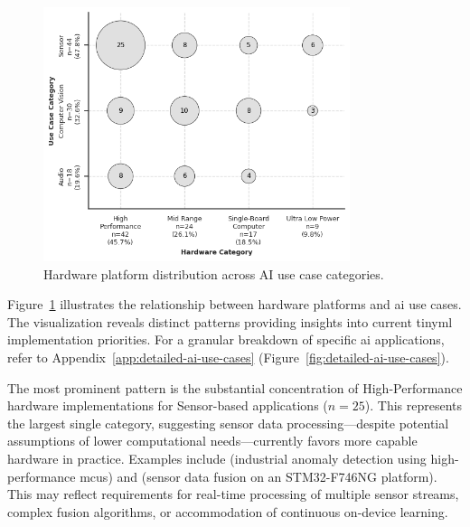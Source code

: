 \begin{figure}[htbp]
    \centering
    \includegraphics[width=0.8\textwidth]{figs/research_results/sms_hardware_use_case.png} 
    \caption[Mapping of Hardware Platforms to AI Use Cases]{Hardware platform distribution across AI use case categories.}
    \label{fig:bubble-chart-hardware-vs-aiusecase} %
\end{figure}

Figure~\ref{fig:bubble-chart-hardware-vs-aiusecase} illustrates the relationship between hardware platforms and \gls{ai} use cases. The visualization reveals distinct patterns providing insights into current \gls{tinyml} implementation priorities. For a granular breakdown of specific \gls{ai} applications, refer to Appendix~\ref{app:detailed-ai-use-cases} (Figure~\ref{fig:detailed-ai-use-cases}).

The most prominent pattern is the substantial concentration of High-Performance hardware implementations for Sensor-based applications ($n=25$). This represents the largest single category, suggesting sensor data processing—despite potential assumptions of lower computational needs—currently favors more capable hardware in practice. Examples include \cite{antoniniTinyMLOpsFrameworkOrchestrating2022} (industrial anomaly detection using high-performance \glspl{mcu}) and \cite{fraidlingTinyMachineLearning2023} (sensor data fusion on an STM32-F746NG platform). This may reflect requirements for real-time processing of multiple sensor streams, complex fusion algorithms, or accommodation of continuous on-device learning.

